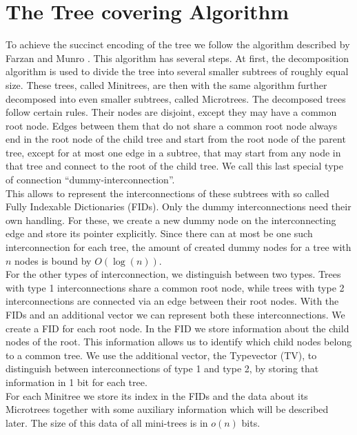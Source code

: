 \documentclass{article}
\begin{document}
\section{The Tree covering Algorithm} \label{The Tree covering Algorithm}
To achieve the succinct encoding of the tree we follow the algorithm described by Farzan and Munro \cite{farzanMunro}. This algorithm has several steps. At first, the decomposition algorithm is used to divide the tree into several smaller subtrees of roughly equal size. These trees, called Minitrees, are then with the same algorithm further decomposed into even smaller subtrees, called Microtrees. The decomposed trees follow certain rules. Their nodes are disjoint, except they may have a common root node. Edges between them that do not share a common root node always end in the root node of the child tree and start from the root node of the parent tree, except for at most one edge in a subtree, that may start from any node in that tree and connect to the root of the child tree. We call this last special type of connection “dummy-interconnection”.\\
This allows to represent the interconnections of these subtrees with so called Fully Indexable Dictionaries (FIDs). Only the dummy interconnections need their own handling. For these, we create a new dummy node on the interconnecting edge and store its pointer explicitly. Since there can at most be one such interconnection for each tree, the amount of created dummy nodes for a tree with $n$ nodes is bound by $O(\log (n))$.\\
For the other types of interconnection, we distinguish between two types. Trees with type 1 interconnections share a common root node, while trees with type 2 interconnections are connected via an edge between their root nodes. With the FIDs and an additional vector we can represent both these interconnections. We create a FID for each root node. In the FID we store information about the child nodes of the root. This information allows us to identify which child nodes belong to a common tree. We use the additional vector, the Typevector (TV), to distinguish between interconnections of type 1 and type 2, by storing that information in 1 bit for each tree.\\
For each Minitree we store its index in the FIDs and the data about its Microtrees together with some auxiliary information which will be described later. The size of this data of all mini-trees is in $o(n)$ bits.
\end{document}
